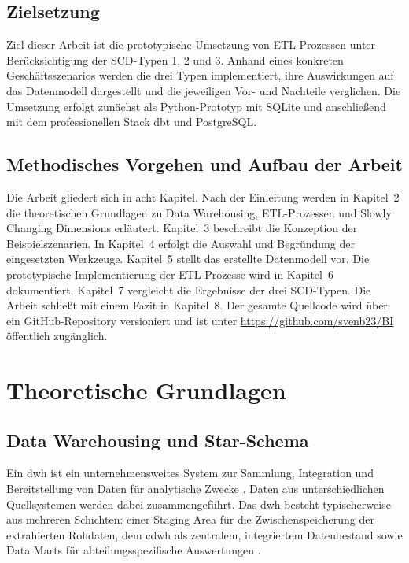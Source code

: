 \documentclass[a4paper,11pt]{article}
\begin{document}
\subsection{Zielsetzung}
Ziel dieser Arbeit ist die prototypische Umsetzung von ETL-Prozessen unter Berücksichtigung der SCD-Typen 
1, 2 und 3. Anhand eines konkreten Geschäftsszenarios werden die drei Typen implementiert, ihre Auswirkungen 
auf das Datenmodell dargestellt und die jeweiligen Vor- und Nachteile verglichen. Die Umsetzung erfolgt zunächst 
als Python-Prototyp mit SQLite und anschließend mit dem professionellen Stack dbt und PostgreSQL.

\subsection{Methodisches Vorgehen und Aufbau der Arbeit}
Die Arbeit gliedert sich in acht Kapitel. Nach der Einleitung werden in Kapitel~2 die theoretischen 
Grundlagen zu Data Warehousing, ETL-Prozessen und Slowly Changing Dimensions erläutert. Kapitel~3 beschreibt 
die Konzeption der Beispielszenarien. In Kapitel~4 erfolgt die Auswahl und Begründung der eingesetzten Werkzeuge. 
Kapitel~5 stellt das erstellte Datenmodell vor. Die prototypische Implementierung der ETL-Prozesse wird in 
Kapitel~6 dokumentiert. Kapitel~7 vergleicht die Ergebnisse der drei SCD-Typen. Die Arbeit schließt mit einem Fazit in Kapitel~8. Der gesamte Quellcode wird über ein GitHub-Repository versioniert und ist unter \url{https://github.com/svenb23/BI} öffentlich zugänglich.

\section{Theoretische Grundlagen}

\subsection{Data Warehousing und Star-Schema}
Ein \gls{dwh} ist ein unternehmensweites System zur Sammlung, Integration und Bereitstellung von Daten für analytische 
Zwecke \parencite[S.~171]{linstedt2015data}. Daten aus unterschiedlichen Quellsystemen werden dabei zusammengeführt. 
Das \gls{dwh} besteht typischerweise aus mehreren Schichten: einer Staging Area für die Zwischenspeicherung der extrahierten Rohdaten, 
dem \gls{cdwh} als zentralem, integriertem Datenbestand sowie Data Marts für abteilungsspezifische Auswertungen \parencite[S.~56]{gansor2015bicc}.
\end{document}
